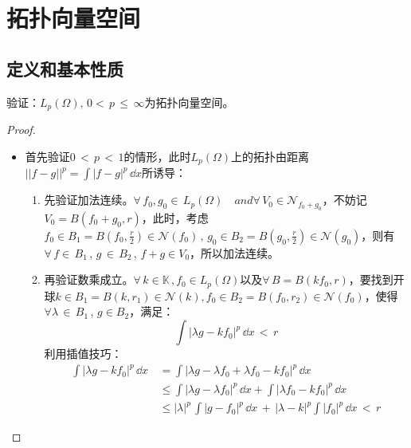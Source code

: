 
\section{拓扑向量空间}
\subsection{定义和基本性质}

\begin{definition}[拓扑向量空间]
	
\end{definition}

\begin{example}
	验证：$L_{p}(\Omega),\, 0<\, p\,\leq\, \infty$为拓扑向量空间。
\end{example}

\begin{proof}
	\begin{itemize}
		\item 首先验证$0\, < \, p\, < \, 1$的情形，此时$L_{p}(\Omega)$上的拓扑由距离$||f-g||^{p}=\int |f-g|^{p}\, \dd x$所诱导：
		\begin{enumerate}
			\item 先验证加法连续。$\forall \, f_{0},g_{0}\in \, L_{p}(\Omega) \quad and \forall \, V_{0}\in \mathcal{N}_{f_{0}+g_{0}}$，不妨记$V_{0}=B(f_{0}+g_{0},r)$，此时，考虑$f_{0}\in B_{1}=B(f_{0},\frac{r}{2})\in \mathcal{N}(f_{0})\, ,\, g_{0}\in B_{2}=B(g_{0},\frac{r}{2})\in\mathcal{N}(g_{0})$，则有$\forall \, f\in \, B_{1}\, ,\, g \, \in \, B_{2}\, ,\, f+g\in V_{0}$，所以加法连续。
			\item 再验证数乘成立。$\forall \, k\in\mathbb{K}\, ,f_{0}\in L_{p}(\Omega)$以及$\forall \, B=B(kf_{0},r)$，要找到开球$k\in B_{1}=B(k,r_{1})\in \mathcal{N}(k),f_{0}\in  B_{2}=B(f_{0},r_{2})\in \mathcal{N}(f_{0})$，使得$\forall \lambda\, \in \, B_{1}\, , \, g\in B_{2}$，满足：
			\begin{equation*}
				\int |\lambda g-kf_{0}|^{p}\, \dd x\, < \, r
			\end{equation*}
		利用插值技巧：
			\begin{equation*}
				\begin{aligned}
				\int |\lambda g-kf_{0}|^{p}\,\dd
				 x \, &=\int |\lambda g-\lambda f_{0} + \lambda f_{0}-kf_{0}|^{p}\,\dd x\\
				 &\leq \int |\lambda g-\lambda f_{0}|^{p}\,\dd x +\int |\lambda f_{0}-kf_{0}|^{p}\, \dd x\\
				 &\leq |\lambda|^{p}\, \int |g-f_{0}|^{p}\,\dd x \,+\, |\lambda -k|^{p} \int |f_{0}|^{p}\,\dd x \, < \,r 			 

\end{aligned}
\end{equation*}
\end{enumerate}
\end{itemize}
\end{proof}
